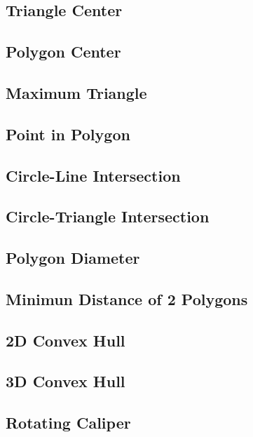 \documentclass[a4paper,10pt,twocolumn,oneside]{article}
\begin{document}
\subsection{Triangle Center}

\subsection{Polygon Center}

\subsection{Maximum Triangle}

\subsection{Point in Polygon}

\subsection{Circle-Line Intersection}

\subsection{Circle-Triangle Intersection}

\subsection{Polygon Diameter}

\subsection{Minimun Distance of 2 Polygons}

\subsection{2D Convex Hull}

\subsection{3D Convex Hull}

\subsection{Rotating Caliper}

\end{document}
